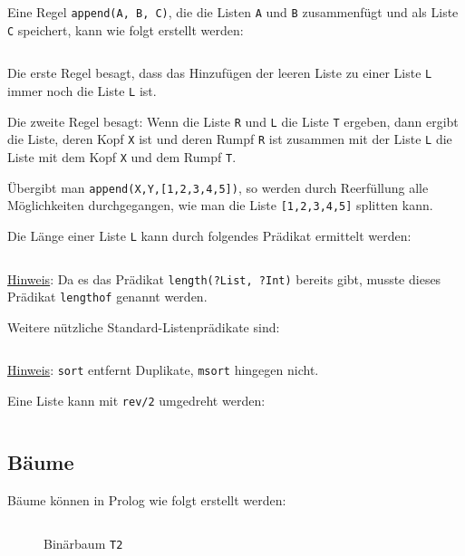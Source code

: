 \inputminted[numbersep=5pt, tabsize=4]{prolog}{scripts/prolog/liste-member.pl}

Eine Regel \texttt{append(A, B, C)}, die die Listen \texttt{A} und \texttt{B} 
zusammenfügt und als Liste \texttt{C} speichert, kann
wie folgt erstellt werden:

\inputminted[numbersep=5pt, tabsize=4]{prolog}{scripts/prolog/liste-append.pl}

Die erste Regel besagt, dass das Hinzufügen der leeren Liste zu einer Liste 
\texttt{L} immer noch die Liste \texttt{L} ist.

Die zweite Regel besagt: Wenn die Liste \texttt{R} und \texttt{L} die Liste \texttt{T}
ergeben, dann ergibt die Liste, deren Kopf \texttt{X} ist und deren Rumpf \texttt{R}
ist zusammen mit der Liste \texttt{L} die Liste mit dem Kopf \texttt{X} und dem
Rumpf \texttt{T}.

Übergibt man \texttt{append(X,Y,[1,2,3,4,5])}, so werden durch Reerfüllung alle
Möglichkeiten durchgegangen, wie man die Liste \texttt{[1,2,3,4,5]} splitten kann.

Die Länge einer Liste \texttt{L} kann durch folgendes Prädikat ermittelt werden:%

\inputminted[numbersep=5pt, tabsize=4]{prolog}{scripts/prolog/list-length.pl}

\underline{Hinweis}: Da es das Prädikat \texttt{length(?List, ?Int)} bereits gibt, 
musste dieses Prädikat \texttt{lengthof} genannt werden.

Weitere nützliche Standard-Listenprädikate sind:
\inputminted[numbersep=5pt, tabsize=4]{prolog}{scripts/prolog/standard-list-predicates.pl}

\underline{Hinweis}: \texttt{sort} entfernt Duplikate, \texttt{msort} hingegen nicht.

Eine Liste kann mit \texttt{rev/2} umgedreht werden:
\inputminted[numbersep=5pt, tabsize=4]{prolog}{scripts/prolog/reverse-list.pl}

\subsection{Bäume}
Bäume können in Prolog wie folgt erstellt werden:

\inputminted[numbersep=5pt, tabsize=4]{prolog}{scripts/prolog/binary-tree-example.pl}

\begin{figure}[htp]
    \centering
     
    \caption{Binärbaum \texttt{T2}}
    \label{fig:binary-tree-t2}
\end{figure}

